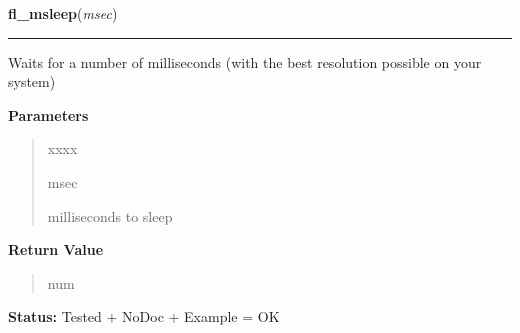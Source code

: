     \label{xformslib:library:fl_msleep}

    \vspace{0.5ex}

\hspace{.8\funcindent}\begin{boxedminipage}{\funcwidth}

    \raggedright \textbf{fl\_msleep}(\textit{msec})

    \vspace{-1.5ex}

    \rule{\textwidth}{0.5\fboxrule}
\setlength{\parskip}{2ex}
    Waits for a number of milliseconds (with the best resolution possible 
    on your system)

\setlength{\parskip}{1ex}
      \textbf{Parameters}
      \vspace{-1ex}

      \begin{quote}
        \begin{Ventry}{xxxx}

          \item[msec]

          milliseconds to sleep

        \end{Ventry}

      \end{quote}

      \textbf{Return Value}
    \vspace{-1ex}

      \begin{quote}
      num

      \end{quote}

\textbf{Status:} Tested + NoDoc + Example = OK



    \end{boxedminipage}

    \label{xformslib:library:fl_is_same_object}

    \vspace{0.5ex}

